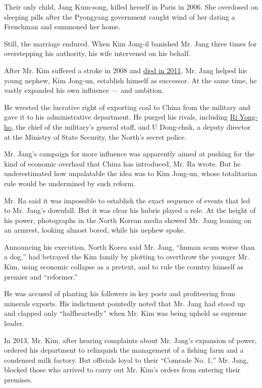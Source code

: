 Their only child, Jang Kum-song, killed herself in Paris in 2006. She
overdosed on sleeping pills after the Pyongyang government caught wind
of her dating a Frenchman and summoned her home.

Still, the marriage endured. When Kim Jong-il banished Mr. Jang three
times for overstepping his authority, his wife intervened on his behalf.

After Mr. Kim suffered a stroke in 2008 and
\href{http://www.nytimes.com/2011/12/19/world/asia/Kim-Jong-il-Dictator-Who-Turned-North-Korea-Into-a-Nuclear-State-Dies.html?pagewanted=all}{died
in 2011}, Mr. Jang helped his young nephew, Kim Jong-un, establish
himself as successor. At the same time, he vastly expanded his own
influence --- and ambition.

He wrested the lucrative right of exporting coal to China from the
military and gave it to his administrative department. He purged his
rivals, including
\href{http://www.nytimes.com/2012/07/16/world/asia/north-korea-removes-army-chief.html}{Ri
Yong-ho}, the chief of the military's general staff, and U Dong-chuk, a
deputy director at the Ministry of State Security, the North's secret
police.

Mr. Jang's campaign for more influence was apparently aimed at pushing
for the kind of economic overhaul that China has introduced, Mr. Ra
wrote. But he underestimated how unpalatable the idea was to Kim
Jong-un, whose totalitarian rule would be undermined by such reform.

Mr. Ra said it was impossible to establish the exact sequence of events
that led to Mr. Jang's downfall. But it was clear his hubris played a
role. At the height of his power, photographs in the North Korean media
showed Mr. Jang leaning on an armrest, looking almost bored, while his
nephew spoke.

Announcing his execution, North Korea said Mr. Jang, ``human scum worse
than a dog,'' had betrayed the Kim family by plotting to overthrow the
younger Mr. Kim, using economic collapse as a pretext, and to rule the
country himself as premier and ``reformer.''

He was accused of planting his followers in key posts and profiteering
from minerals exports. His indictment pointedly noted that Mr. Jang had
stood up and clapped only ``halfheartedly'' when Mr. Kim was being
upheld as supreme leader.

In 2013, Mr. Kim, after hearing complaints about Mr. Jang's expansion of
power, ordered his department to relinquish the management of a fishing
farm and a condensed milk factory. But officials loyal to their
``Comrade No. 1,'' Mr. Jang, blocked those who arrived to carry out Mr.
Kim's orders from entering their premises.

